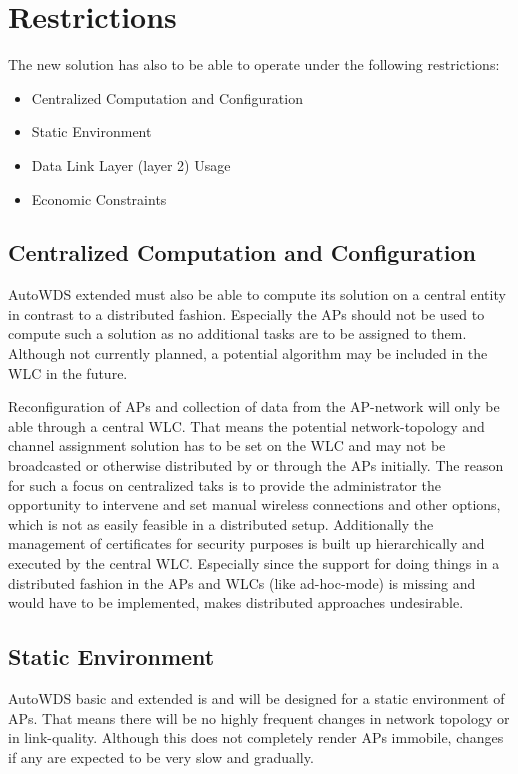   \section{Restrictions}
    The new solution has also to be able to operate under the following restrictions:
    \begin{itemize}
     \item Centralized Computation and Configuration
     \item Static Environment
     \item Data Link Layer (layer 2) Usage
     \item Economic Constraints
    \end{itemize}
    
    \subsection{Centralized Computation and Configuration}
      AutoWDS extended must also be able to compute its solution on a central entity in contrast to a distributed fashion.
      Especially the APs should not be used to compute such a solution as no additional tasks are to be assigned to them.
      Although not currently planned, a potential algorithm may be included in the \ac{WLC} in the future.
      
      Reconfiguration of APs and collection of data from the \ac{AP}-network will only be able through a central \ac{WLC}.
      That means the potential network-topology and channel assignment solution has to be set on the \ac{WLC} and may not be broadcasted or otherwise
      distributed by or through the APs initially. The reason for such a focus on centralized taks is to provide the administrator the 
      opportunity to intervene and set manual wireless connections and other options, which is not as easily feasible in a distributed setup. 
      Additionally the management of certificates for security purposes is built up hierarchically and executed by the central \ac{WLC}.
      Especially since the support for doing things in a distributed fashion in the APs and WLCs (like ad-hoc-mode) is missing and would have to be implemented, 
      makes distributed approaches undesirable.
      
    \subsection{Static Environment}
      AutoWDS basic and extended is and will be designed for a static environment of APs. That means there will be no highly frequent changes in
      network topology or in link-quality. Although this does not completely render APs immobile, changes if any are expected to be very slow and gradually.
      
